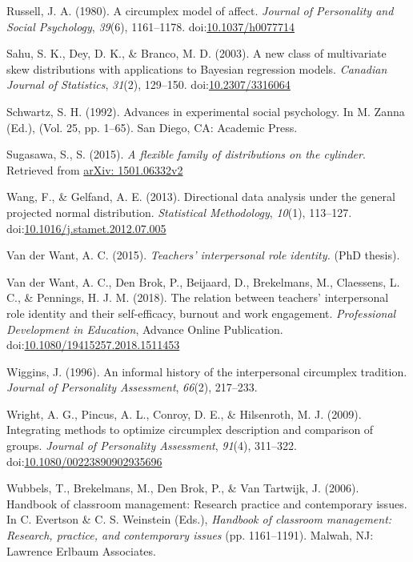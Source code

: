 \documentclass[man,mask]{apa6}
\DeclareRobustCommand{\VANDER}[3]{#2}
\DeclareRobustCommand{\VAN}[3]{#2}
\DeclareRobustCommand{\DEN}[3]{#2}
\begin{document}
\leavevmode\hypertarget{ref-russell1980circumplex}{}%
Russell, J. A. (1980). A circumplex model of affect. \emph{Journal of Personality and Social Psychology}, \emph{39}(6), 1161--1178. doi:\href{https://doi.org/10.1037/h0077714}{10.1037/h0077714}

\leavevmode\hypertarget{ref-sahu2003new}{}%
Sahu, S. K., Dey, D. K., \& Branco, M. D. (2003). A new class of multivariate skew distributions with applications to Bayesian regression models. \emph{Canadian Journal of Statistics}, \emph{31}(2), 129--150. doi:\href{https://doi.org/10.2307/3316064}{10.2307/3316064}

\leavevmode\hypertarget{ref-schwartz1992values}{}%
Schwartz, S. H. (1992). Advances in experimental social psychology. In M. Zanna (Ed.), (Vol. 25, pp. 1--65). San Diego, CA: Academic Press.

\leavevmode\hypertarget{ref-sugasawa2015flexible}{}%
Sugasawa, S., S. (2015). \emph{A flexible family of distributions on the cylinder}. Retrieved from \href{arXiv:\%201501.06332v2}{arXiv: 1501.06332v2}

\leavevmode\hypertarget{ref-wang2012directional}{}%
Wang, F., \& Gelfand, A. E. (2013). Directional data analysis under the general projected normal distribution. \emph{Statistical Methodology}, \emph{10}(1), 113--127. doi:\href{https://doi.org/10.1016/j.stamet.2012.07.005}{10.1016/j.stamet.2012.07.005}

\leavevmode\hypertarget{ref-vanderWant2015role}{}%
\VANDER{Want}{Van der}{van der} Want, A. C. (2015). \emph{Teachers' interpersonal role identity.} (PhD thesis).

\leavevmode\hypertarget{ref-want2018selfefficacy}{}%
\VANDER{Want}{Van der}{van der} Want, A. C., \DEN{Brok}{Den}{den} Brok, P., Beijaard, D., Brekelmans, M., Claessens, L. C., \& Pennings, H. J. M. (2018). The relation between teachers' interpersonal role identity and their self-efficacy, burnout and work engagement. \emph{Professional Development in Education}, Advance Online Publication. doi:\href{https://doi.org/10.1080/19415257.2018.1511453}{10.1080/19415257.2018.1511453}

\leavevmode\hypertarget{ref-wiggins1996history}{}%
Wiggins, J. (1996). An informal history of the interpersonal circumplex tradition. \emph{Journal of Personality Assessment}, \emph{66}(2), 217--233.

\leavevmode\hypertarget{ref-wright2009integrating}{}%
Wright, A. G., Pincus, A. L., Conroy, D. E., \& Hilsenroth, M. J. (2009). Integrating methods to optimize circumplex description and comparison of groups. \emph{Journal of Personality Assessment}, \emph{91}(4), 311--322. doi:\href{https://doi.org/10.1080/00223890902935696}{10.1080/00223890902935696}

\leavevmode\hypertarget{ref-wubbels2006interpersonal}{}%
Wubbels, T., Brekelmans, M., \DEN{Brok}{Den}{den} Brok, P., \& \VAN{Tartwijk}{Van}{van} Tartwijk, J. (2006). Handbook of classroom management: Research practice and contemporary issues. In C. Evertson \& C. S. Weinstein (Eds.), \emph{Handbook of classroom management: Research, practice, and contemporary issues} (pp. 1161--1191). Malwah, NJ: Lawrence Erlbaum Associates.
\end{document}
